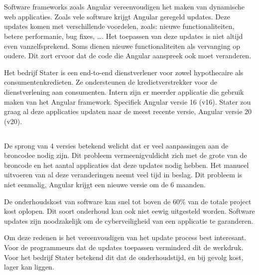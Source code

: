 
\chapter{}%
\label{ch:inleiding}

Software frameworks zoals Angular vereenvoudigen het maken van dynamische web applicaties.
Zoals vele software krijgt Angular geregeld updates.
Deze updates komen met verschillende voordelen, zoals: nieuwe functionaliteiten, betere performanie, bug fixes, \dots.
Het toepassen van deze updates is niet altijd even vanzelfsprekend.
Soms dienen nieuwe functionaliteiten als vervanging op oudere.
Dit zort ervoor dat de code die Angular aanspreek ook moet veranderen.

Het bedrijf Stater is een end-to-end dienstverlener voor zowel hypothecaire als consumentenkredieten.
Ze ondersteunen de kredietverstrekker voor de dienstverlening aan consumenten.
Intern zijn er meerder applicatie die gebruik maken van het Angular framework.
Specifiek Angular versie 16 (v16).
Stater zou graag al deze applicaties updaten naar de meest recente versie, Angular versie 20 (v20).

\section{}%
\label{sec:probleemstelling}

De sprong van 4 versies betekend welicht dat er veel aanpassingen aan de broncodee nodig zijn.
Dit probleem vermeenigvuldicht zich met de grote van de broncode en het aantal applicaties dat deze updates nodig hebben.
Het manueel uitvoeren van al deze veranderingen neemt veel tijd in beslag.
Dit probleem is niet eenmalig, Angular krijgt een nieuwe versie om de 6 maanden.

De onderhoudskost van software kan snel tot boven de 60\% van de totale project kost oplopen.
Dit soort onderhoud kan ook niet eewig uitgesteld worden.
Software updates zijn noodzakelijk om de cyberveiligheid van een applicatie te garanderen.

Om deze redenen is het vereenvoudigen van het update process best interesant.
Voor de programmeurs dat de updates toepassen verminderd dit de werkdruk.
Voor het bedrijf Stater betekend dit dat de onderhoudstijd, en bij gevolg kost, lager kan liggen.

